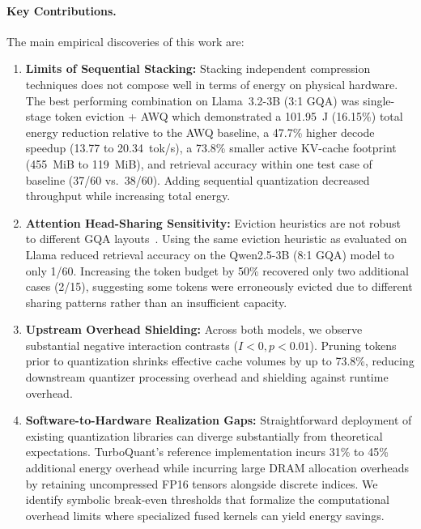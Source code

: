 \documentclass[sigconf,nonacm]{acmart}
\begin{document}
\paragraph{Key Contributions.}
The main empirical discoveries of this work are:
\begingroup\raggedright
\begin{enumerate}
  \item \textbf{Limits of Sequential Stacking:} Stacking independent compression techniques does not compose well in terms of energy on physical hardware. The best performing combination on Llama~3.2-3B (3:1 GQA) was single-stage token eviction + AWQ which demonstrated a 101.95~J (16.15\%) total energy reduction relative to the AWQ baseline, a 47.7\% higher decode speedup (13.77 to 20.34~tok/s), a 73.8\% smaller active KV-cache footprint (455~MiB to 119~MiB), and retrieval accuracy within one test case of baseline (37/60 vs.\ 38/60). Adding sequential quantization decreased throughput while increasing total energy.
  \item \textbf{Attention Head-Sharing Sensitivity:} Eviction heuristics are not robust to different GQA layouts~\cite{ainslie2023gqa}. Using the same eviction heuristic as evaluated on Llama reduced retrieval accuracy on the Qwen2.5-3B (8:1 GQA) model to only 1/60. Increasing the token budget by 50\% recovered only two additional cases (2/15), suggesting some tokens were erroneously evicted due to different sharing patterns rather than an insufficient capacity.
  \item \textbf{Upstream Overhead Shielding:} Across both models, we observe substantial negative interaction contrasts ($I < 0, p < 0.01$). Pruning tokens prior to quantization shrinks effective cache volumes by up to 73.8\%, reducing downstream quantizer processing overhead and shielding against runtime overhead.
  \item \textbf{Software-to-Hardware Realization Gaps:} Straightforward deployment of existing quantization libraries can diverge substantially from theoretical expectations. TurboQuant's reference implementation incurs 31\% to 45\% additional energy overhead while incurring large DRAM allocation overheads by retaining uncompressed FP16 tensors alongside discrete indices. We identify symbolic break-even thresholds that formalize the computational overhead limits where specialized fused kernels can yield energy savings.
\end{enumerate}
\endgroup


\end{document}
